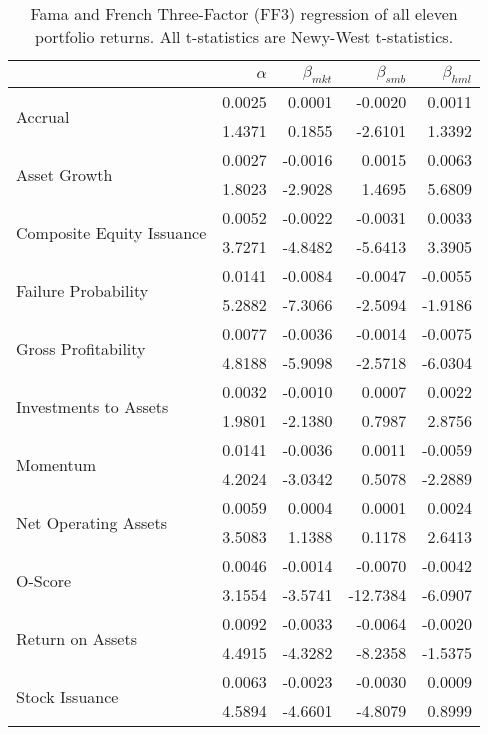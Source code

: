 \begin{table}[h]
    \scriptsize
    \caption{\newline Fama and French Three-Factor (FF3) regression of all eleven portfolio returns. All t-statistics are Newy-West t-statistics.}
    \label{tab:Table 3}
    \begin{tabular}{@{}lrrrr@{}}
    \toprule
     & $\alpha$ & $\beta_{mkt}$ & $\beta_{smb}$ & $\beta_{hml}$ \\ \midrule
    \multirow{2}{*}{Accrual} & 0.0025 & 0.0001 & -0.0020 & 0.0011 \\
     & 1.4371 & 0.1855 & -2.6101 & 1.3392 \\
    \multirow{2}{*}{Asset Growth} & 0.0027 & -0.0016 & 0.0015 & 0.0063 \\
     & 1.8023 & -2.9028 & 1.4695 & 5.6809 \\
    \multirow{2}{*}{Composite Equity Issuance} & 0.0052 & -0.0022 & -0.0031 & 0.0033 \\
     & 3.7271 & -4.8482 & -5.6413 & 3.3905 \\
    \multirow{2}{*}{Failure Probability} & 0.0141 & -0.0084 & -0.0047 & -0.0055 \\
     & 5.2882 & -7.3066 & -2.5094 & -1.9186 \\
    \multirow{2}{*}{Gross Profitability} & 0.0077 & -0.0036 & -0.0014 & -0.0075 \\
     & 4.8188 & -5.9098 & -2.5718 & -6.0304 \\
    \multirow{2}{*}{Investments to Assets} & 0.0032 & -0.0010 & 0.0007 & 0.0022 \\
     & 1.9801 & -2.1380 & 0.7987 & 2.8756 \\
    \multirow{2}{*}{Momentum} & 0.0141 & -0.0036 & 0.0011 & -0.0059 \\
     & 4.2024 & -3.0342 & 0.5078 & -2.2889 \\
    \multirow{2}{*}{Net Operating Assets} & 0.0059 & 0.0004 & 0.0001 & 0.0024 \\
     & 3.5083 & 1.1388 & 0.1178 & 2.6413 \\
    \multirow{2}{*}{O-Score} & 0.0046 & -0.0014 & -0.0070 & -0.0042 \\
     & 3.1554 & -3.5741 & -12.7384 & -6.0907 \\
    \multirow{2}{*}{Return on Assets} & 0.0092 & -0.0033 & -0.0064 & -0.0020 \\
     & 4.4915 & -4.3282 & -8.2358 & -1.5375 \\
    \multirow{2}{*}{Stock Issuance} & 0.0063 & -0.0023 & -0.0030 & 0.0009 \\
     & 4.5894 & -4.6601 & -4.8079 & 0.8999 \\ \bottomrule
    \end{tabular}
\end{table}

